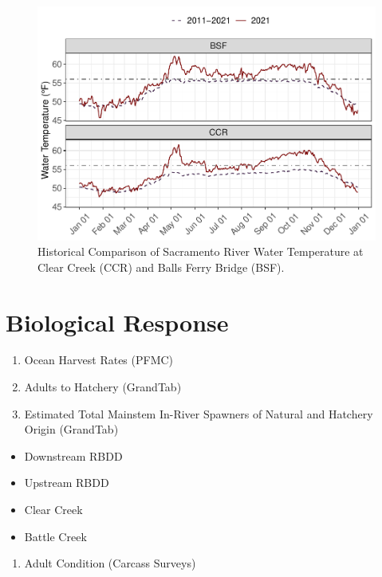 \documentclass[
]{book}
\providecommand{\tightlist}{%
  \setlength{\itemsep}{0pt}\setlength{\parskip}{0pt}}
\theoremstyle{definition}
\theoremstyle{definition}
\theoremstyle{definition}
\theoremstyle{definition}
\theoremstyle{remark}
\begin{document}
\begin{figure}
\centering
\includegraphics{_main_files/figure-latex/historicalwtemp-fig-1.pdf}
\caption{\label{fig:historicalwtemp-fig}Historical Comparison of Sacramento River Water Temperature at Clear Creek (CCR) and Balls Ferry Bridge (BSF).}
\end{figure}

\hypertarget{biological-response}{%
\section{Biological Response}\label{biological-response}}

\begin{enumerate}
\def\labelenumi{\arabic{enumi}.}
\item
  Ocean Harvest Rates (PFMC)
\item
  Adults to Hatchery (GrandTab)
\item
  Estimated Total Mainstem In-River Spawners of Natural and Hatchery Origin (GrandTab)
\end{enumerate}

\begin{itemize}
\tightlist
\item
  Downstream RBDD
\item
  Upstream RBDD
\item
  Clear Creek
\item
  Battle Creek
\end{itemize}

\begin{enumerate}
\def\labelenumi{\arabic{enumi}.}
\setcounter{enumi}{3}
\tightlist
\item
  Adult Condition (Carcass Surveys)
\end{enumerate}
\end{document}
